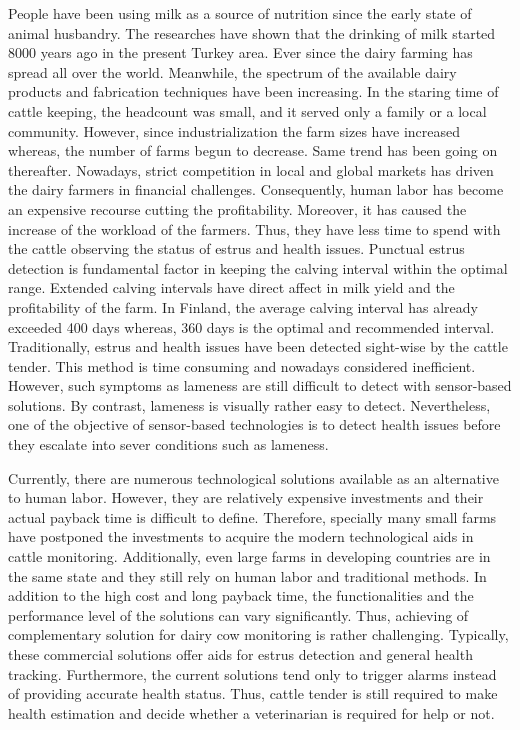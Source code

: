 \documentclass[english,12pt,a4paper,pdftex,elec,utf8]{aaltothesis}
\begin{document}
People have been using milk as a source of nutrition since the early state of animal husbandry. The researches have shown that the drinking of milk started 8000 years ago in the present Turkey area. Ever since the dairy farming has spread all over the world. Meanwhile, the spectrum of the available dairy products and fabrication techniques have been increasing. In the staring time of cattle keeping, the headcount was small, and it served only a family or a local community. However, since industrialization the farm sizes have increased whereas, the number of farms begun to decrease. Same trend has been going on thereafter. Nowadays, strict competition in local and global markets has driven the dairy farmers in financial challenges. Consequently, human labor has become an expensive recourse cutting the profitability. Moreover, it has caused the increase of the workload of the farmers. Thus, they have less time to spend with the cattle observing the status of estrus and health issues. Punctual estrus detection is fundamental factor in keeping the calving interval within the optimal range. Extended calving intervals have direct affect in milk yield and the profitability of the farm. In Finland, the average calving interval has already exceeded 400 days whereas, 360 days is the optimal and recommended interval. Traditionally, estrus and health issues have been detected sight-wise by the cattle tender. This method is time consuming and nowadays considered inefficient. However, such symptoms as lameness are still difficult to detect with sensor-based solutions. By contrast, lameness is visually rather easy to detect. Nevertheless, one of the objective of sensor-based technologies is to detect health issues before they escalate into sever conditions such as lameness.

Currently, there are numerous technological solutions available as an alternative to human labor. However, they are relatively expensive investments and their actual payback time is difficult to define. Therefore, specially many small farms have postponed the investments to acquire the modern technological aids in cattle monitoring. Additionally, even large farms in developing countries are in the same state and they still rely on human labor and traditional methods. In addition to the high cost and long payback time, the functionalities and the performance level of the solutions can vary significantly. Thus, achieving of complementary solution for dairy cow monitoring is rather challenging. Typically, these commercial solutions offer aids for estrus detection and general health tracking. Furthermore, the current solutions tend only to trigger alarms instead of providing accurate health status. Thus, cattle tender is still required to make health estimation and decide whether a veterinarian is required for help or not.
\end{document}
